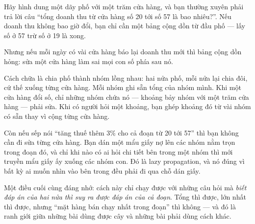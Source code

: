 \documentclass[../../algorithm.tex]{subfiles}
\begin{document}
\begin{dongian}
Hãy hình dung một dãy phố với một trăm cửa hàng, và bạn thường xuyên phải trả lời câu ``tổng doanh thu từ cửa hàng số 20 tới số 57 là bao nhiêu?''. Nếu doanh thu không bao giờ đổi, bạn chỉ cần một bảng cộng dồn từ đầu phố --- lấy số ở 57 trừ số ở 19 là xong.

Nhưng nếu mỗi ngày có vài cửa hàng báo lại doanh thu mới thì bảng cộng dồn hỏng: sửa một cửa hàng làm sai mọi con số phía sau nó.

Cách chữa là chia phố thành nhóm lồng nhau: hai nửa phố, mỗi nửa lại chia đôi, cứ thế xuống từng cửa hàng. Mỗi nhóm ghi sẵn tổng của nhóm mình. Khi một cửa hàng đổi số, chỉ những nhóm chứa nó --- khoảng bảy nhóm với một trăm cửa hàng --- phải sửa. Khi có người hỏi một khoảng, bạn ghép khoảng đó từ vài nhóm có sẵn thay vì cộng từng cửa hàng.

Còn nếu sếp nói ``tăng thuế thêm 3\% cho cả đoạn từ 20 tới 57'' thì bạn không cần đi sửa từng cửa hàng. Bạn dán một mẩu giấy nợ lên các nhóm nằm trọn trong đoạn đó, và chỉ khi nào có ai hỏi chi tiết bên trong một nhóm thì mới truyền mẩu giấy ấy xuống các nhóm con. Đó là lazy propagation, và nó đúng vì bất kỳ ai muốn nhìn vào bên trong đều phải đi qua chỗ dán giấy.

Một điều cuối cùng đáng nhớ: cách này chỉ chạy được với những câu hỏi mà \emph{biết đáp án của hai nửa thì suy ra được đáp án của cả đoạn}. Tổng thì được, lớn nhất thì được, nhưng ``mặt hàng bán chạy nhất trong đoạn'' thì không --- và đó là ranh giới giữa những bài dùng được cây và những bài phải dùng cách khác.
\end{dongian}
\end{document}
